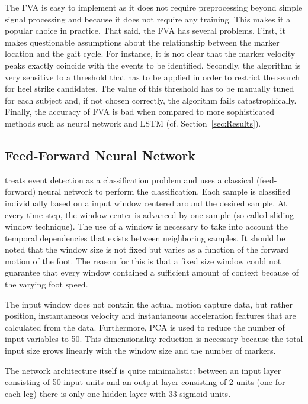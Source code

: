 \documentclass{acm_proc_article-sp}
\begin{document}
The FVA is easy to implement as it does not require preprocessing beyond simple
signal processing and because it does not require any training.
This makes it a popular choice in practice.
That said, the FVA has several problems.
First, it makes questionable assumptions about the relationship between the
marker location and the gait cycle.
For instance, it is not clear that the marker velocity peaks exactly coincide
with the events to be identified.
Secondly, the algorithm is very sensitive to a threshold that has to be applied
in order to restrict the search for heel strike candidates.
The value of this threshold has to be manually tuned for each subject and, if
not chosen correctly, the algorithm fails catastrophically.
Finally, the accuracy of FVA is bad when compared to more sophisticated methods
such as neural network and LSTM
(cf. Section~\ref{sec:Results}).


\subsection{Feed-Forward Neural Network}
\label{sub:Feed-Forward Neural Network}

\citet{Miller2009}
treats event detection as a classification problem and uses a classical
(feed-forward) neural network to perform the classification.
Each sample is classified individually based on a input window centered around
the desired sample.
At every time step, the window center is advanced by one sample
(so-called sliding window technique).
The use of a window is necessary to take into account the temporal dependencies
that exists between neighboring samples.
It should be noted that the window size is not fixed but varies as a function of
the forward motion of the foot. 
The reason for this is that a fixed size window could not guarantee that every
window contained a sufficient amount of context because of the varying foot
speed.

The input window does not contain the actual motion capture data, but rather
position, instantaneous velocity and instantaneous acceleration features that
are calculated from the data.
Furthermore, PCA is used to reduce the number of input variables to 50.
This dimensionality reduction is necessary because the total input size grows
linearly with the window size and the number of markers.

The network architecture itself is quite minimalistic: between an input layer
consisting of 50 input units and an output layer consisting of 2 units (one
for each leg) there is only one hidden layer with 33 sigmoid units.
\end{document}
